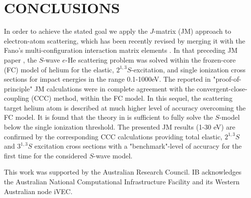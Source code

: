 \documentclass[aip
, pra
, showpacs
, aps
, twocolumn
, groupedaddress
, floatfix
]{revtex4}
\begin{document}
\begin{table}[htb]
\begin{ruledtabular}
\begin{tabular}{rlll}




\end{tabular}
\end{ruledtabular}
\end{table}


\section{CONCLUSIONS}


In order to achieve the stated goal we apply the $J$-matrix (JM) approach to electron-atom scattering,
which has been recently revised by merging it with the Fano's multi-configuration interaction matrix elements \cite{Fano65}.
In that preceding JM paper \cite{BF11},
the $S$-wave $e$-He scattering problem was solved within the frozen-core (FC) model of helium for
the elastic, $2^{1,3}S$-excitation, and single ionization cross sections for impact energies in the range 0.1-1000eV.
The reported in \cite{BF11} "proof-of-principle" JM calculations were in complete agreement with the convergent-close-coupling (CCC) method,
within the FC model.
In this sequel, the scattering target helium atom is described at much higher level of accuracy overcoming the FC model.
It is found that the theory in \cite{BF11} is sufficient to fully solve the $S$-model below the single ionization threshold.
The presented JM results (1-30 eV) are confirmed by the corresponding CCC calculations providing
total elastic, $2^{1,3}S$ and $3^{1,3}S$ excitation cross sections with a "benchmark"-level of accuracy for the first time for the considered $S$-wave model.


\begin{acknowledgments}
This work was supported by the Australian Research Council. IB
acknowledges the Australian National Computational Infrastructure
Facility and its Western Australian node iVEC.
\end{acknowledgments}





\end{document}
